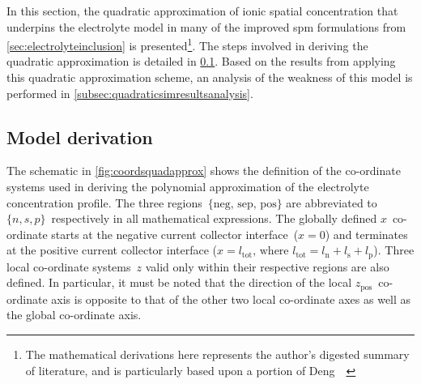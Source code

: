 
In this section, the quadratic approximation of ionic spatial concentration that
underpins the electrolyte  model in many of the  improved \gls{spm} formulations
from  \cref{sec:electrolyteinclusion}   is  presented\footnote{The  mathematical
derivations  here  represents  the  author's  digested  summary  of  literature,
and  is  particularly  based  upon  a  portion  of  Deng~\etal~\cite{Deng2018}}.
The  steps  involved  in  deriving   the  quadratic  approximation  is  detailed
in  \cref{subsec:quadraticmodelderiv}.  Based  on   the  results  from  applying
this   quadratic   approximation   scheme,   an   analysis   of   the   weakness
of  this   model  is  performed   in  \cref{subsec:quadraticsimresultsanalysis}.

\subsection{Model derivation}\label{subsec:quadraticmodelderiv}

The  schematic  in  \cref{fig:coordsquadapprox}  shows  the  definition  of  the
co-ordinate  systems  used  in  deriving the  polynomial  approximation  of  the
electrolyte  concentration   profile.  The  three   regions~${\{\text{neg,  sep,
pos}\}}$  are  abbreviated  to ${\{n,s,p\}}$~respectively  in  all  mathematical
expressions. The globally defined $x$~co-ordinate starts at the negative current
collector interface~(${x=0}$)  and terminates at the  positive current collector
interface  ($x  = l_\text{tot},\,  \text{where  }  l_\text{tot} =  l_\text{n}  +
l_\text{s} + l_\text{p}$). Three local co-ordinate systems~$z$ valid only within
their respective regions are also defined.  In particular, it must be noted that
the direction of  the local $z_\text{pos}$~co-ordinate axis is  opposite to that
of the other two local co-ordinate axes as well as the global co-ordinate axis.


